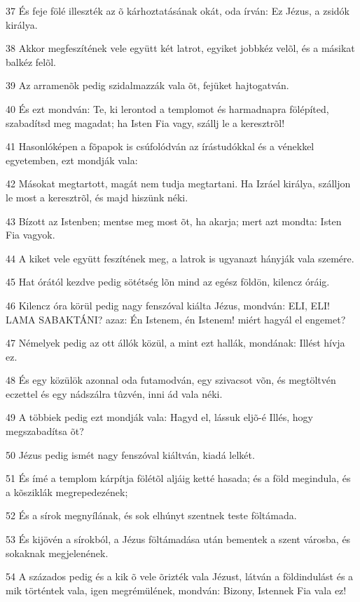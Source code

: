 \par 37 És feje fölé illeszték az õ kárhoztatásának okát, oda írván: Ez Jézus, a zsidók királya.
\par 38 Akkor megfeszítének vele együtt két latrot, egyiket jobbkéz velõl, és a másikat balkéz felõl.
\par 39 Az arramenõk pedig szidalmazzák vala õt, fejüket hajtogatván.
\par 40 És ezt mondván: Te, ki lerontod a templomot és harmadnapra fölépíted, szabadítsd meg magadat; ha Isten Fia vagy, szállj le a keresztrõl!
\par 41 Hasonlóképen a fõpapok is csúfolódván az írástudókkal és a vénekkel egyetemben, ezt mondják vala:
\par 42 Másokat megtartott, magát nem tudja megtartani. Ha Izráel királya, szálljon le most a keresztrõl, és majd hiszünk néki.
\par 43 Bízott az Istenben; mentse meg most õt, ha akarja; mert azt mondta: Isten Fia vagyok.
\par 44 A kiket vele együtt feszítének meg, a latrok is ugyanazt hányják vala szemére.
\par 45 Hat órától kezdve pedig sötétség lõn mind az egész földön, kilencz óráig.
\par 46 Kilencz óra körül pedig nagy fenszóval kiálta Jézus, mondván: ELI, ELI! LAMA SABAKTÁNI? azaz: Én Istenem, én Istenem! miért hagyál el engemet?
\par 47 Némelyek pedig az ott állók közül, a mint ezt hallák, mondának: Illést hívja ez.
\par 48 És egy közülök azonnal oda futamodván, egy szivacsot võn, és megtöltvén eczettel és egy nádszálra tûzvén, inni ád vala néki.
\par 49 A többiek pedig ezt mondják vala: Hagyd el, lássuk eljõ-é Illés, hogy megszabadítsa õt?
\par 50 Jézus pedig ismét nagy fenszóval kiáltván, kiadá lelkét.
\par 51 És ímé a templom kárpítja fölétõl aljáig ketté hasada; és a föld megindula, és a kõsziklák megrepedezének;
\par 52 És a sírok megnyílának, és sok elhúnyt szentnek teste föltámada.
\par 53 És kijövén a sírokból, a Jézus föltámadása után bementek a szent városba, és sokaknak megjelenének.
\par 54 A százados pedig és a kik õ vele õrizték vala Jézust, látván a földindulást és a mik történtek vala, igen megrémülének, mondván: Bizony, Istennek Fia vala ez!
